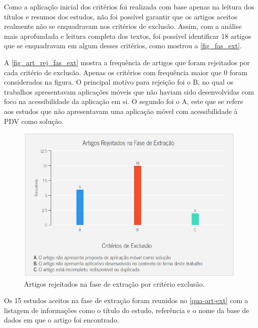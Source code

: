 Como a aplicação inicial dos critérios foi realizada com base apenas na leitura dos títulos e resumos dos estudos, não foi possível garantir que os artigos aceitos realmente não se enquadravam nos critérios de exclusão.
Assim, com a análise mais aprofundada e leitura completa dos textos, foi possível identificar 18 artigos que se enquadravam em algum desses critérios, como mostrou a \autoref{fig_fas_ext}.

\newpage

A \autoref{fig_art_rej_fas_ext} mostra a frequência de artigos que foram rejeitados por cada critério de exclusão.
Apenas os critérios com frequência maior que 0 foram considerados na figura.
O principal motivo para rejeição foi o B, no qual os trabalhos apresentavam aplicações móveis que não haviam sido desenvolvidas com foco na acessibilidade da aplicação em si.
O segundo foi o A, este que se refere aos estudos que não apresentavam uma aplicação móvel com acessibilidade à PDV como solução.

\begin{figure}[htb]
  \caption{\label{fig_art_rej_fas_ext}Artigos rejeitados na fase de extração por critério exclusão.}
  \begin{center}
    \includegraphics[scale=0.7]{Imagens/msl/artigos_rejeitados_fase_extracao.png}
  \end{center}
\end{figure}

Os 15 estudos aceitos na fase de extração foram reunidos no \autoref{qua-art-ext} com a listagem de informações como o título do estudo, referência e o nome da base de dados em que o artigo foi encontrado.

